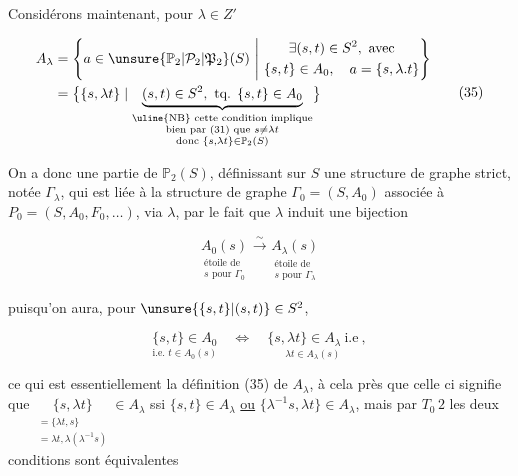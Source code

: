 
Considérons maintenant, pour $\lambda\in Z'$

\[
\begin{aligned}
 A_\lambda&=\left\{a\in\unsure{\mathbb P_2|\mathcal P_2|\mathfrak P_2}(S)\ \middle|\ 
 \begin{gathered}\exists(s,t)\in S^2,\ \text{avec}\\
 \{s,t\}\in A_0,\quad a=\{s,\lambda.t\}\end{gathered}\right\}\\
 &=\bigl\{\{s,\lambda t\}\mid
 \underbrace{(s,t)\in S^2,\ \text{tq. }\{s,t\}\in A_0}_{\substack{\text{\uline{NB} cette condition implique}\\
 \text{bien par (31) que }s\ne\lambda t\\
 \text{donc }\{s,\lambda t\}\in\mathbb P_2(S)}}\bigr\}
\end{aligned}\tag*{$(35)$}
\]

On a donc  une  partie de $\mathbb P_2(S)$, définissant sur $S$ une structure de graphe strict, notée $\Gamma_\lambda$, qui est liée à la structure de graphe $\Gamma_0=(S,A_0)$ associée à  $P_0=(S,A_0,F_0,\ldots)$, via $\lambda$, par le fait que $\lambda$ induit une bijection

\[
\underset{\substack{\text{étoile de}\\s\text{ pour }\Gamma_0}}{A_0(s)}
 \xrightarrow{\ \sim\ }
\underset{\substack{\text{étoile de}\\s\text{ pour }\Gamma_\lambda}}{A_\lambda(s)}
\tag*{$(36)$}
\]

puisqu'on aura, pour $\unsure{\{s,t\}|(s,t)}\in S^2$, \unsure{)}

\[
\underset{\text{i.e. }t\in A_0(s)}{\{s,t\}\in A_0}\quad\Longleftrightarrow\quad
\underset{\lambda t\in A_\lambda(s)}{\{s,\lambda t\}\in A_\lambda\ \text{i.e}}\ ,
\tag*{$(37)$}
\]

ce qui est essentiellement la définition (35) de $A_\lambda$, à cela près que celle ci signifie que $\underset{\substack{=\{\lambda t,s\}\\=\lambda t,\lambda(\lambda^{-1}s)}}{\{s,\lambda t\}}\in A_\lambda$ ssi  \unsure{--} $\{s,t\}\in A_\lambda$ \uline{ou} $\{\lambda^{-1}s,\lambda t\}\in A_\lambda$, mais par $T_0\,2$ les deux conditions sont équivalentes
